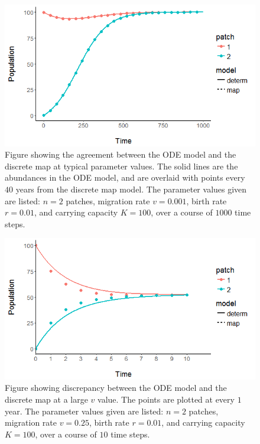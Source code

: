 \documentclass[12pt, openany]{book}
\theoremstyle{definition}
\theoremstyle{remark}
\numberwithin{equation}{chapter}
\numberwithin{figure}{chapter}
\begin{document}
\begin{figure}[t!]
\begin{center}
       \includegraphics[width=1.0\textwidth]{odemap1.png}
       \caption{Figure showing the agreement between the ODE model and the discrete map at typical parameter values. The solid lines are the abundances in the ODE model, and are overlaid with points every $40$ years from the discrete map model. The parameter values given are listed: $n = 2$ patches, migration rate $v = 0.001$, birth rate $r = 0.01$, and carrying capacity $K = 100$, over a course of $1000$ time steps. \label{odemap1}}
\end{center}
\end{figure}
\begin{figure}[t!]
\begin{center}
       \includegraphics[width=1.0\textwidth]{odemap2.png}
       \caption{Figure showing discrepancy between the ODE model and the discrete map at a large $v$ value. The points are plotted at every $1$ year. The parameter values given are listed: $n = 2$ patches, migration rate $v = 0.25$, birth rate $r = 0.01$, and carrying capacity $K = 100$, over a course of $10$ time steps. \label{odemap2}}
\end{center}
\end{figure}
\end{document}
